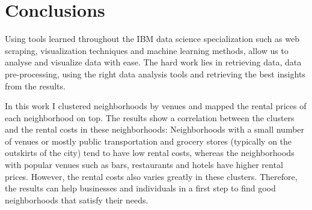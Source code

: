 \documentclass[a4paper,12pt,english]{article}
\begin{document}
\section{Conclusions}
Using tools learned throughout the IBM data science specialization such as web scraping, visualization techniques and machine learning methods, allow us to analyse and visualize data with ease. The hard work lies in retrieving data, data pre-processing, using the right data analysis tools and retrieving the best insights from the results. \par
In this work I clustered neighborhoods by venues and mapped the rental prices of each neighborhood on top. The results show a correlation between the clusters and the rental costs in these neighborhoods: Neighborhoods with a small number of venues or mostly public transportation and grocery stores (typically on the outskirts of the city) tend to have low rental costs, whereas the neighborhoods with popular venues such as bars, restaurants and hotels have higher rental prices. However, the rental costs also varies greatly in these clusters. Therefore, the results can help businesses and individuals in a first step to find good neighborhoods that satisfy their needs.
\end{document}

